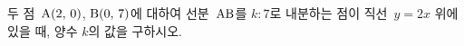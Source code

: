 두 점~$\mathrm{A}(2,\mkern3mu 0)$, $\mathrm{B}(0,\mkern3mu 7)$에 대하여 선분~$\mathrm{AB}$를 $k:7$로 내분하는 점이 직선~$y=2x$ 위에 있을 때, 양수 $k$의 값을 구하시오.
